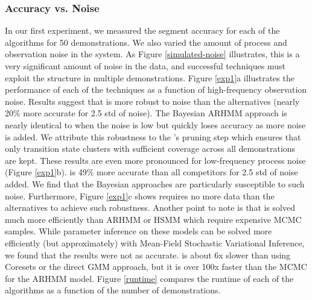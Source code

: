 \subsubsection{Accuracy vs. Noise}
In our first experiment, we measured the segment accuracy for each of the algorithms for 50 demonstrations.
We also varied the amount of process and observation noise in the system.
As Figure \ref{simulated-noise} illustrates, this is a very significant amount of noise in the data, and successful techniques must exploit the structure in multiple demonstrations.
Figure \ref{exp1}a illustrates the performance of each of the techniques as a function of high-frequency observation noise.
Results suggest that \tsc is more robust to noise than the alternatives (nearly 20\% more accurate for 2.5 std of noise).
The Bayesian ARHMM approach is nearly identical to \tsc when the noise is low but quickly loses accuracy as more noise is added.
We attribute this robustness to the \tsc's pruning step which ensures that only transition state clusters with sufficient coverage across all demonstrations are kept.
These results are even more pronounced for low-frequency process noise (Figure \ref{exp1}b). \tsc is 49\% more accurate than all competitors for 2.5 std of noise added.
We find that the Bayesian approaches are particularly susceptible to such noise.
Furthermore, Figure \ref{exp1}c shows \tsc requires no more data than the alternatives to achieve such robustness.
Another point to note is that \tsc is solved much more efficiently than ARHMM or HSMM which require expensive MCMC samples.
While parameter inference on these models can be solved more efficiently (but approximately) with Mean-Field Stochastic Variational Inference, we found that the results were not as accurate.
\tsc is about 6x slower than using Coresets or the direct GMM approach, but it is over 100x faster than the MCMC for the ARHMM model.
Figure \ref{runtime} compares the runtime of each of the algorithms as a function of the number of demonstrations.

